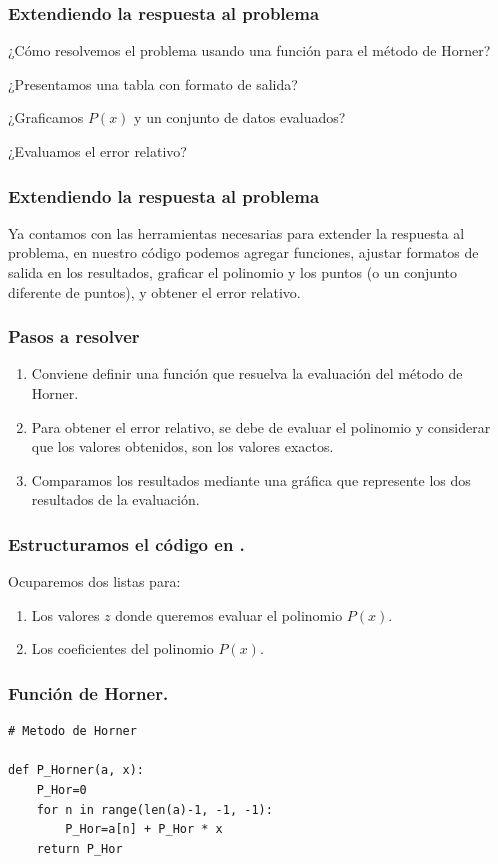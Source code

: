 \documentclass[12pt]{beamer}
\begin{document}
\begin{frame}
\frametitle{Extendiendo la respuesta al problema}
¿Cómo resolvemos el problema usando una función para el método de Horner? \pause

¿Presentamos una tabla con formato de salida? \pause

¿Graficamos $P (x)$ y un conjunto de datos evaluados? \pause

¿Evaluamos el error relativo?
\end{frame}
\begin{frame}
\frametitle{Extendiendo la respuesta al problema}
Ya contamos con las herramientas necesarias para extender la respuesta al problema, \pause en nuestro código podemos agregar funciones, \pause ajustar formatos de salida en los resultados, \pause graficar el polinomio y los puntos (o un conjunto diferente de puntos), \pause y obtener el error relativo.
\end{frame}
\begin{frame}
\frametitle{Pasos a resolver}
\begin{enumerate}[<+->]
\item Conviene definir una función que resuelva la evaluación del método de Horner.
\item Para obtener el error relativo, se debe de evaluar el polinomio y considerar que los valores obtenidos, son los valores exactos.
\item Comparamos los resultados mediante una gráfica que represente los dos resultados de la evaluación.
\end{enumerate}
\end{frame}
\begin{frame}[fragile]
\frametitle{Estructuramos el código en \python.}
Ocuparemos dos listas para:
\begin{enumerate}[<+->]
\item Los valores $z$ donde queremos evaluar el polinomio $P (x)$.
\item Los coeficientes del polinomio $P (x)$.
\end{enumerate}
\end{frame}
\begin{frame}[fragile]
\frametitle{Función de Horner.}
\fontsize{14}{14}\selectfont
\begin{lstlisting}[caption=Código para la función de Horner]
# Metodo de Horner

def P_Horner(a, x):
    P_Hor=0
    for n in range(len(a)-1, -1, -1):     
        P_Hor=a[n] + P_Hor * x
    return P_Hor
\end{lstlisting}
\end{frame}
\end{document}
